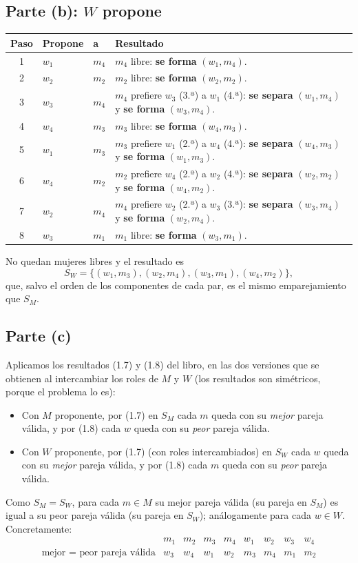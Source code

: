 \subsection*{Parte (b): $W$ propone}
\begin{center}
\begin{tabular}{cllp{7.5cm}}
\toprule
Paso & Propone & a & Resultado \\
\midrule
1 & $w_1$ & $m_4$ & $m_4$ libre: \textbf{se forma} $(w_1,m_4)$.\\
2 & $w_2$ & $m_2$ & $m_2$ libre: \textbf{se forma} $(w_2,m_2)$.\\
3 & $w_3$ & $m_4$ & $m_4$ prefiere $w_3$ (3.ª) a $w_1$ (4.ª): \textbf{se separa} $(w_1,m_4)$ y \textbf{se forma} $(w_3,m_4)$.\\
4 & $w_4$ & $m_3$ & $m_3$ libre: \textbf{se forma} $(w_4,m_3)$.\\
5 & $w_1$ & $m_3$ & $m_3$ prefiere $w_1$ (2.ª) a $w_4$ (4.ª): \textbf{se separa} $(w_4,m_3)$ y \textbf{se forma} $(w_1,m_3)$.\\
6 & $w_4$ & $m_2$ & $m_2$ prefiere $w_4$ (2.ª) a $w_2$ (4.ª): \textbf{se separa} $(w_2,m_2)$ y \textbf{se forma} $(w_4,m_2)$.\\
7 & $w_2$ & $m_4$ & $m_4$ prefiere $w_2$ (2.ª) a $w_3$ (3.ª): \textbf{se separa} $(w_3,m_4)$ y \textbf{se forma} $(w_2,m_4)$.\\
8 & $w_3$ & $m_1$ & $m_1$ libre: \textbf{se forma} $(w_3,m_1)$.\\
\bottomrule
\end{tabular}
\end{center}
No quedan mujeres libres y el resultado es
\[
S_W=\{(w_1,m_3),(w_2,m_4),(w_3,m_1),(w_4,m_2)\},
\]
que, salvo el orden de los componentes de cada par, es el mismo emparejamiento que $S_M$.

\subsection*{Parte (c)}
Aplicamos los resultados (1.7) y (1.8) del libro, en las dos versiones que se obtienen al
intercambiar los roles de $M$ y $W$ (los resultados son simétricos, porque el problema lo es):
\begin{itemize}
  \item Con $M$ proponente, por (1.7) en $S_M$ cada $m$ queda con su \emph{mejor} pareja
        válida, y por (1.8) cada $w$ queda con su \emph{peor} pareja válida.
  \item Con $W$ proponente, por (1.7) (con roles intercambiados) en $S_W$ cada $w$ queda con su
        \emph{mejor} pareja válida, y por (1.8) cada $m$ queda con su \emph{peor} pareja válida.
\end{itemize}
Como $S_M=S_W$, para cada $m\in M$ su mejor pareja válida (su pareja en $S_M$) es igual a su
peor pareja válida (su pareja en $S_W$); análogamente para cada $w\in W$. Concretamente:
\[
\begin{array}{c|cccc|cccc}
 & m_1 & m_2 & m_3 & m_4 & w_1 & w_2 & w_3 & w_4\\\hline
\text{mejor = peor pareja válida} & w_3 & w_4 & w_1 & w_2 & m_3 & m_4 & m_1 & m_2
\end{array}
\]

